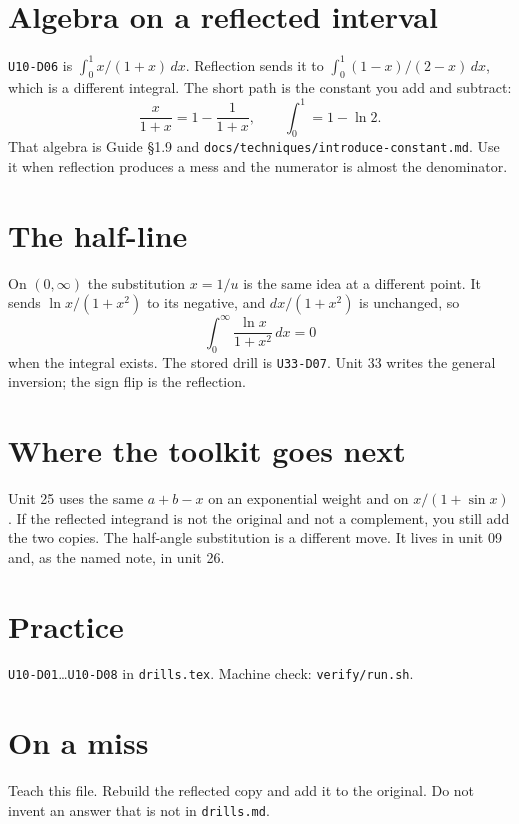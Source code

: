 \section{Algebra on a reflected interval}
\texttt{U10-D06} is $\int_0^1 x/(1+x)\,dx$. Reflection sends it to $\int_0^1 (1-x)/(2-x)\,dx$, which is a different integral. The short path is the constant you add and subtract:
\[
\frac{x}{1+x}=1-\frac{1}{1+x},\qquad \int_0^1=1-\ln 2.
\]
That algebra is Guide \S1.9 and \texttt{docs/techniques/introduce-constant.md}. Use it when reflection produces a mess and the numerator is almost the denominator.

\section{The half-line}
On $(0,\infty)$ the substitution $x=1/u$ is the same idea at a different point.
It sends $\ln x/(1+x^2)$ to its negative, and $dx/(1+x^2)$ is unchanged, so
\[
\int_0^\infty\frac{\ln x}{1+x^2}\,dx=0
\]
when the integral exists. The stored drill is \texttt{U33-D07}. Unit 33 writes the general inversion; the sign flip is the reflection.

\section{Where the toolkit goes next}
Unit 25 uses the same $a+b-x$ on an exponential weight and on $x/(1+\sin x)$. If the reflected integrand is not the original and not a complement, you still add the two copies. The half-angle substitution is a different move. It lives in unit 09 and, as the named note, in unit 26.

\section{Practice}
\texttt{U10-D01}\ldots\texttt{U10-D08} in \texttt{drills.tex}. Machine check: \texttt{verify/run.sh}.

\section*{On a miss}
Teach this file. Rebuild the reflected copy and add it to the original. Do not invent an answer that is not in \texttt{drills.md}.

